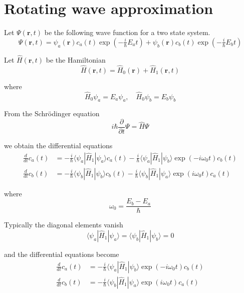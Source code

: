 

\section*{Rotating wave approximation}

Let $\Psi(\mathbf r,t)$ be the following wave function for a two state system.
\begin{equation*}
\Psi(\mathbf r,t)=\psi_a(\mathbf r)c_a(t)\exp(-\tfrac{i}{\hbar}E_at)+
\psi_b(\mathbf r)c_b(t)\exp(-\tfrac{i}{\hbar}E_bt)
\end{equation*}

Let $\hat H(\mathbf r,t)$ be the Hamiltonian
\begin{equation*}
\hat H(\mathbf r,t)=\hat H_0(\mathbf r)+\hat H_1(\mathbf r,t)
\end{equation*}

where
\begin{equation*}
\hat H_0\psi_a=E_a\psi_a,\quad\hat H_0\psi_b=E_b\psi_b
\end{equation*}

From the Schr\"odinger equation
\begin{equation*}
i\hbar\frac{\partial}{\partial t}\Psi=\hat H\Psi
\end{equation*}

we obtain the differential equations
\begin{equation*}
\begin{aligned}
\frac{d}{dt}c_a(t)&=-\frac{i}{\hbar}\langle\psi_a|\hat H_1|\psi_a\rangle c_a(t)
-\frac{i}{\hbar}\langle\psi_a|\hat H_1|\psi_b\rangle\exp(-i\omega_0t)c_b(t)
\\[1ex]
\frac{d}{dt}c_b(t)&=-\frac{i}{\hbar}\langle\psi_b|\hat H_1|\psi_b\rangle c_b(t)
-\frac{i}{\hbar}\langle\psi_b|\hat H_1|\psi_a\rangle\exp(i\omega_0t)c_a(t)
\end{aligned}
\end{equation*}

where
\begin{equation*}
\omega_0=\frac{E_b-E_a}{\hbar}
\end{equation*}

Typically the diagonal elements vanish
\begin{equation*}
\langle\psi_a|\hat H_1|\psi_a\rangle=\langle\psi_b|\hat H_1|\psi_b\rangle=0
\end{equation*}

and the differential equations become
\begin{align*}
\frac{d}{dt}c_a(t)&=-\frac{i}{\hbar}\langle\psi_a|\hat H_1|\psi_b\rangle\exp(-i\omega_0t)c_b(t)
\tag{1}
\\[1ex]
\frac{d}{dt}c_b(t)&=-\frac{i}{\hbar}\langle\psi_b|\hat H_1|\psi_a\rangle\exp(i\omega_0t)c_a(t)
\tag{2}
\end{align*}

